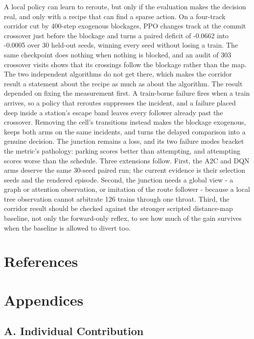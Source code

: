 \documentclass[11pt,a4paper]{article}
\begin{document}
A local policy can learn to reroute, but only if the evaluation makes the decision real, and only with a recipe that can find a sparse action. On a four-track corridor cut by 400-step exogenous blockages, PPO changes track at the commit crossover just before the blockage and turns a paired deficit of -0.0662 into -0.0005 over 30 held-out seeds, winning every seed without losing a train. The same checkpoint does nothing when nothing is blocked, and an audit of 303 crossover visits shows that its crossings follow the blockage rather than the map. The two independent algorithms do not get there, which makes the corridor result a statement about the recipe as much as about the algorithm.
The result depended on fixing the measurement first. A train-borne failure fires when a train arrives, so a policy that reroutes suppresses the incident, and a failure placed deep inside a station's escape band leaves every follower already past the crossover. Removing the cell's transitions instead makes the blockage exogenous, keeps both arms on the same incidents, and turns the delayed comparison into a genuine decision. The junction remains a loss, and its two failure modes bracket the metric's pathology: parking scores better than attempting, and attempting scores worse than the schedule.
Three extensions follow. First, the A2C and DQN arms deserve the same 30-seed paired run; the current evidence is their selection seeds and the rendered episode. Second, the junction needs a global view - a graph or attention observation, or imitation of the route follower - because a local tree observation cannot arbitrate 126 trains through one throat. Third, the corridor result should be checked against the stronger scripted distance-map baseline, not only the forward-only reflex, to see how much of the gain survives when the baseline is allowed to divert too.

\clearpage
\section{References}

\printbibliography[heading=none]


\clearpage
\section*{Appendices}

\subsection*{A. Individual Contribution}
\end{document}
